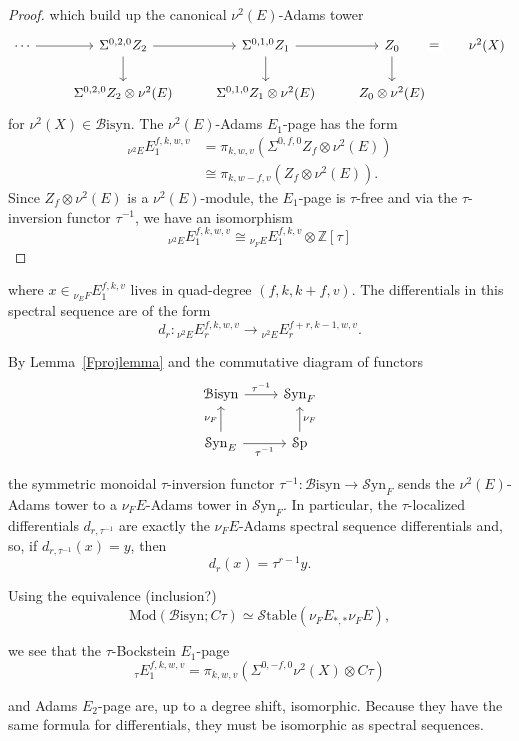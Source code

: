 \documentclass[10pt]{amsart}
\theoremstyle{definition}
\numberwithin{figure}{section}
\numberwithin{equation}{section}
\theoremstyle{cited}
\newcommand{\bZ}{\mathbb{Z}}
\newcommand{\Sp}{{\mathcal{S}\mathrm{p}}}
\newcommand{\Mod}{\mathrm{Mod}}
\newcommand{\Syn}{\mathcal{S}\mathrm{yn}}
\newcommand{\Bisyn}{\mathcal{B}\mathrm{isyn}}
\newcommand{\Stable}{\mathcal{S}\mathrm{table}}
\begin{document}
\begin{proof}
which build up the canonical $\nu^2(E)$-Adams tower
\begin{equation*}
	\begin{tikzcd}
\cdots \arrow[r] & \Sigma^{0,2,0}Z_2 \arrow[r] \arrow[d] & \Sigma^{0,1,0}Z_1 \arrow[r] \arrow[d] & Z_0 \arrow[r, phantom, "{=}" description] \ar[d] & \nu^2(X) \\
                 & \Sigma^{0,2,0}Z_2\otimes\nu^2(E)      & \Sigma^{0,1,0}Z_1\otimes\nu^2(E)      & Z_0\otimes\nu^2(E)     
\end{tikzcd} 
\end{equation*}
for $\nu^2(X)\in\Bisyn$. The $\nu^2(E)$-Adams $E_1$-page has the form
$$
\begin{aligned}
{}_{\nu^2E}E_1^{f,k,w,v}&=\pi_{k,w,v}(\Sigma^{0,f,0}Z_f\otimes\nu^2(E)) \\
&\cong\pi_{k,w-f,v}(Z_f\otimes\nu^2(E)).
\end{aligned}
$$
Since $Z_f\otimes \nu^2(E)$ is a $\nu^2(E)$-module, the $E_1$-page is $\tau$-free and via the $\tau$-inversion functor $\tau^{-1}$, we have an isomorphism
$$
{}_{\nu^2E}E_1^{f,k,w,v}\cong{}_{\nu_FE}E_1^{f,k,v}\otimes\bZ[\tau]
$$
\end{proof}

where $x\in{}_{\nu_EF}E_1^{f,k,v}$ lives in quad-degree $(f,k,k+f,v)$. The differentials in this spectral sequence are of the form
$$
d_r:{}_{\nu^2E}E_r^{f,k,w,v}\to {}_{\nu^2E}E_r^{f+r,k-1,w,v}.
$$

By Lemma~\ref{Fprojlemma} and the commutative diagram of functors
\begin{equation*}
\begin{tikzcd}
\Bisyn \arrow[r,"\tau^{-1}"]           & \Syn_F        \\
\Syn_E \arrow[u,"\nu_F"] \arrow[r,"\tau^{-1}"'] & \Sp \arrow[u,"\nu_F"']
\end{tikzcd}
\end{equation*}

the symmetric monoidal $\tau$-inversion functor $\tau^{-1}:\Bisyn\to\Syn_F$ sends the $\nu^2(E)$-Adams tower to a $\nu_FE$-Adams tower in $\Syn_F$. In particular, the $\tau$-localized differentials $d_{r,\tau^{-1}}$ are exactly the $\nu_FE$-Adams spectral sequence differentials and, so, if $d_{r,\tau^{-1}}(x)=y$, then
$$
d_r(x)=\tau^{r-1}y.
$$

Using the equivalence (inclusion?)
$$
\Mod(\Bisyn;C\tau)\simeq\Stable(\nu_FE_{*,*}\nu_FE),
$$

we see that the $\tau$-Bockstein $E_1$-page
$$
{}_{\tau}E_1^{f,k,w,v}=\pi_{k,w,v}(\Sigma^{0,-f,0}\nu^2(X)\otimes C\tau)
$$

and Adams $E_2$-page are, up to a degree shift, isomorphic. Because they have the same formula for differentials, they must be isomorphic as spectral sequences.

\printbibliography
\end{document}
